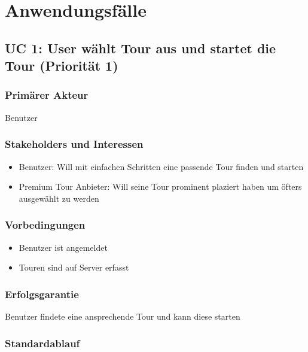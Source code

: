 \documentclass[ngerman,]{article}
\providecommand{\tightlist}{%
  \setlength{\itemsep}{0pt}\setlength{\parskip}{0pt}}
\begin{document}
\section{Anwendungsfälle}\label{anwendungsfuxe4lle}

\subsection{UC 1: User wählt Tour aus und startet die Tour (Priorität
1)}\label{uc-1-user-wuxe4hlt-tour-aus-und-startet-die-tour-priorituxe4t-1}

\subsubsection{Primärer Akteur}\label{primuxe4rer-akteur}

Benutzer

\subsubsection{Stakeholders und
Interessen}\label{stakeholders-und-interessen}

\begin{itemize}
\tightlist
\item
  Benutzer: Will mit einfachen Schritten eine passende Tour finden und
  starten
\item
  Premium Tour Anbieter: Will seine Tour prominent plaziert haben um
  öfters ausgewählt zu werden
\end{itemize}

\subsubsection{Vorbedingungen}\label{vorbedingungen}

\begin{itemize}
\tightlist
\item
  Benutzer ist angemeldet
\item
  Touren sind auf Server erfasst
\end{itemize}

\subsubsection{Erfolgsgarantie}\label{erfolgsgarantie}

Benutzer findete eine ansprechende Tour und kann diese starten

\subsubsection{Standardablauf}\label{standardablauf}
\end{document}
